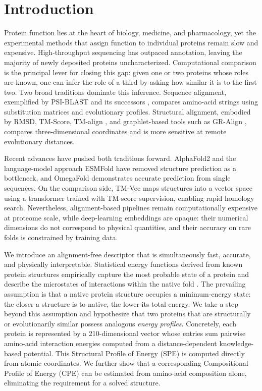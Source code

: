 
\section{Introduction}

Protein function lies at the heart of biology, medicine, and pharmacology, yet the experimental methods that assign function to individual proteins remain slow and expensive. High-throughput sequencing has outpaced annotation, leaving the majority of newly deposited proteins uncharacterized. Computational comparison is the principal lever for closing this gap: given one or two proteins whose roles are known, one can infer the role of a third by asking how similar it is to the first two. Two broad traditions dominate this inference. Sequence alignment, exemplified by PSI-BLAST and its successors \citep{boratyn2012delta}, compares amino-acid strings using substitution matrices and evolutionary profiles. Structural alignment, embodied by RMSD, TM-Score, TM-align \citep{zhang2005tmalign}, and graphlet-based tools such as GR-Align \citep{maloddognin2014gralign}, compares three-dimensional coordinates and is more sensitive at remote evolutionary distances.

Recent advances have pushed both traditions forward. AlphaFold2 \citep{jumper2021alphafold} and the language-model approach ESMFold \citep{lin2023esmfold} have removed structure prediction as a bottleneck, and OmegaFold \citep{wu2022omegafold} demonstrates accurate prediction from single sequences. On the comparison side, TM-Vec \citep{hamamsy2024tmvec} maps structures into a vector space using a transformer trained with TM-score supervision, enabling rapid homology search. Nevertheless, alignment-based pipelines remain computationally expensive at proteome scale, while deep-learning embeddings are opaque: their numerical dimensions do not correspond to physical quantities, and their accuracy on rare folds is constrained by training data.

We introduce an alignment-free descriptor that is simultaneously fast, accurate, and physically interpretable. Statistical energy functions derived from known protein structures empirically capture the most probable state of a protein and describe the microstates of interactions within the native fold \citep{koppensteiner1998knowledge,sippl1990potential}. The prevailing assumption is that a native protein structure occupies a minimum-energy state: the closer a structure is to native, the lower its total energy. We take a step beyond this assumption and hypothesize that two proteins that are structurally or evolutionarily similar possess analogous \emph{energy profiles}. Concretely, each protein is represented by a 210-dimensional vector whose entries sum pairwise amino-acid interaction energies computed from a distance-dependent knowledge-based potential. This Structural Profile of Energy (SPE) is computed directly from atomic coordinates. We further show that a corresponding Compositional Profile of Energy (CPE) can be estimated from amino-acid composition alone, eliminating the requirement for a solved structure.

